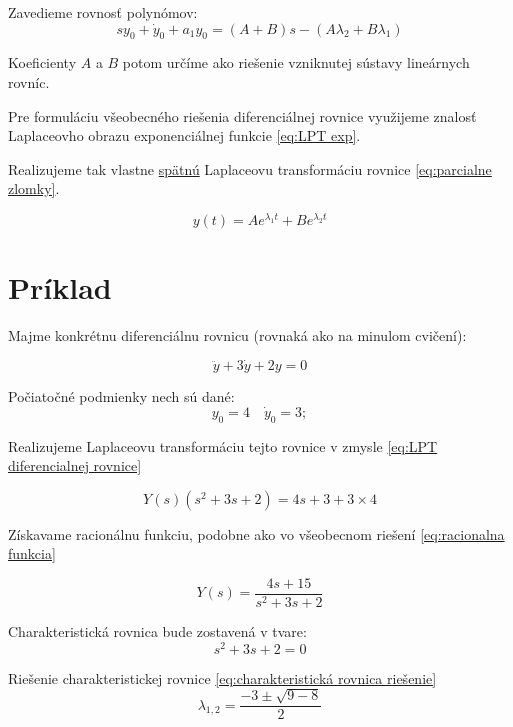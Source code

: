 \documentclass[a4paper,10pt]{article}
\begin{document}
Zavedieme rovnosť polynómov:
\begin{equation*}
sy_0+\dot{y}_0+a_1 y_0=(A+B)s-(A\lambda_2+B\lambda_1)
\end{equation*}

Koeficienty $A$ a $B$ potom určíme ako riešenie vzniknutej sústavy lineárnych rovníc.

Pre formuláciu všeobecného riešenia diferenciálnej rovnice využijeme znalosť Laplaceovho obrazu exponenciálnej funkcie \eqref{eq:LPT exp}.

Realizujeme tak vlastne \underline{spätnú} Laplaceovu transformáciu rovnice \eqref{eq:parcialne zlomky}.


\begin{equation}
\label{eq: riešenie všeobecné}
y(t)=Ae^{\lambda_1t}+Be^{\lambda_2t}
\end{equation}

\pagebreak

\section{Príklad}
Majme konkrétnu diferenciálnu rovnicu (rovnaká ako na minulom cvičení):

\begin{equation*}
\ddot{y}+3\dot{y}+2y=0 
\end{equation*}

Počiatočné podmienky nech sú dané:
\begin{equation*}
	y_0=4\quad \dot{y}_0=3;
\end{equation*}

Realizujeme Laplaceovu transformáciu tejto rovnice v zmysle \eqref{eq:LPT diferencialnej rovnice}

\begin{equation*}
	Y(s)\left(s^2+3s+2\right)=4s+3+3\times4
\end{equation*}

Získavame racionálnu funkciu, podobne ako vo všeobecnom riešení \eqref{eq:racionalna funkcia}

\begin{equation*}
Y(s)=\frac{4s+15}{s^2+3s+2}
\end{equation*}

Charakteristická rovnica bude zostavená v tvare:
\begin{equation*}
	s^2+3s+2=0
\end{equation*}

Riešenie charakteristickej rovnice \eqref{eq:charakteristická rovnica riešenie}
\begin{equation*}
	\lambda_{1,2}=\frac{-3\pm\sqrt{9-8}}{2}
\end{equation*}
\end{document}
